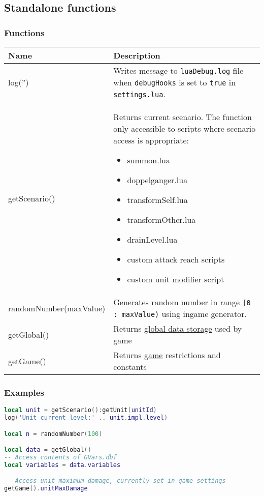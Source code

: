 \subsection{Standalone functions}
\subsubsection{Functions}
\begin{center}
\begin{tabularx}{\linewidth}{| l | X |}
\hline
\textbf{Name} & \textbf{Description} \\
\hline
log('') & Writes message to \texttt{luaDebug.log} file when \texttt{debugHooks} is set to \texttt{true} in \texttt{settings.lua}.\\
\hline
getScenario() & Returns current scenario. The function only accessible to scripts where scenario access is appropriate:
\begin{itemize}
\item summon.lua
\item doppelganger.lua
\item transformSelf.lua
\item transformOther.lua
\item drainLevel.lua
\item custom attack reach scripts
\item custom unit modifier script
\end{itemize}
\\
\hline
randomNumber(maxValue) & Generates random number in range \texttt{[0 : maxValue)} using ingame generator.\\
\hline
getGlobal() & Returns \hyperref[Global]{global data storage} used by game\\
\hline
getGame() & Returns \hyperref[Game]{game} restrictions and constants\\
\hline
\end{tabularx}
\end{center}
\subsubsection{Examples}
\begin{center}
\begin{lstlisting}[language=Lua]
local unit = getScenario():getUnit(unitId)
log('Unit current level:' .. unit.impl.level)

local n = randomNumber(100)

local data = getGlobal()
-- Access contents of GVars.dbf
local variables = data.variables

-- Access unit maximum damage, currently set in game settings
getGame().unitMaxDamage
\end{lstlisting}
\end{center}